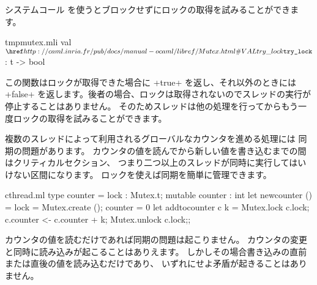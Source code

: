 システムコール  を使うとブロックせずにロックの取得を試みることができます。
%
\begin{listingcodefile}{tmpmutex.mli}
val $\libvalue{Mutex}{try\_lock}$ : t -> bool
\end{listingcodefile}
%
この関数はロックが取得できた場合に \ml+true+ を返し、それ以外のときには \ml+false+
を返します。後者の場合、ロックは取得されないのでスレッドの実行が停止することはありません。
そのためスレッドは他の処理を行ってからもう一度ロックの取得を試みることができます。

\begin{example}

複数のスレッドによって利用されるグローバルなカウンタを進める処理には
同期の問題があります。
カウンタの値を読んでから新しい値を書き込むまでの間はクリティカルセクション、
つまり二つ以上のスレッドが同時に実行してはいけない区間になります。
ロックを使えば同期を簡単に管理できます。
%
\begin{listingcodefile}{cthread.ml}
type counter = { lock : Mutex.t; mutable counter : int }
let newcounter () = { lock = Mutex.create (); counter = 0 }
let addtocounter c k =
  Mutex.lock c.lock;
  c.counter <- c.counter + k;
  Mutex.unlock c.lock;;
\end{listingcodefile}
%
カウンタの値を読むだけであれば同期の問題は起こりません。
カウンタの変更と同時に読み込みが起こることはありえます。
しかしその場合書き込みの直前または直後の値を読み込むだけであり、
いずれにせよ矛盾が起きることはありません。
\end{example}

